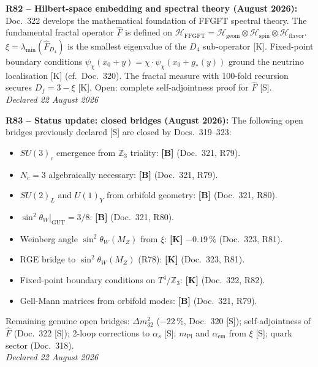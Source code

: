 \medskip
\textbf{R82 -- Hilbert-space embedding and spectral theory (August 2026):} Doc.~322 develops the mathematical foundation of FFGFT spectral theory. The fundamental fractal operator $\hat{F}$ is defined on $\mathcal{H}_{\mathrm{FFGFT}} = \mathcal{H}_{\mathrm{geom}}\otimes\mathcal{H}_{\mathrm{spin}}\otimes\mathcal{H}_{\mathrm{flavor}}$. $\xi = \lambda_{\min}(\hat{F}_{D_4})$ is the smallest eigenvalue of the $D_4$ sub-operator [K]. Fixed-point boundary conditions $\psi_\chi(x_0+y) = \chi\cdot\psi_\chi(x_0+g_*(y))$ ground the neutrino localisation [K] (cf.\ Doc.~320). The fractal measure with 100-fold recursion secures $D_f = 3-\xi$ [K]. Open: complete self-adjointness proof for $\hat{F}$ [S].\\
\emph{Declared 22 August 2026}

\medskip
\textbf{R83 -- Status update: closed bridges (August 2026):} The following open bridges previously declared [S] are closed by Docs.~319--323:
\begin{itemize}
  \item $SU(3)_c$ emergence from $\mathbb{Z}_3$ triality: \textbf{[B]} (Doc.~321, R79).
  \item $N_c=3$ algebraically necessary: \textbf{[B]} (Doc.~321, R79).
  \item $SU(2)_L$ and $U(1)_Y$ from orbifold geometry: \textbf{[B]} (Doc.~321, R80).
  \item $\sin^2\theta_W|_{\mathrm{GUT}}=3/8$: \textbf{[B]} (Doc.~321, R80).
  \item Weinberg angle $\sin^2\theta_W(M_Z)$ from $\xi$: \textbf{[K]} $-0.19\,\%$ (Doc.~323, R81).
  \item RGE bridge to $\sin^2\theta_W(M_Z)$ (R78): \textbf{[K]} (Doc.~323, R81).
  \item Fixed-point boundary conditions on $T^4/\mathbb{Z}_3$: \textbf{[K]} (Doc.~322, R82).
  \item Gell-Mann matrices from orbifold modes: \textbf{[B]} (Doc.~321, R79).
\end{itemize}
Remaining genuine open bridges: $\Delta m_{32}^2$ ($-22\,\%$, Doc.~320 [S]); self-adjointness of $\hat{F}$ (Doc.~322 [S]); 2-loop corrections to $\alpha_s$ [S]; $m_{\mathrm{Pl}}$ and $\alpha_{\mathrm{em}}$ from $\xi$ [S]; quark sector (Doc.~318).\\
\emph{Declared 22 August 2026}

